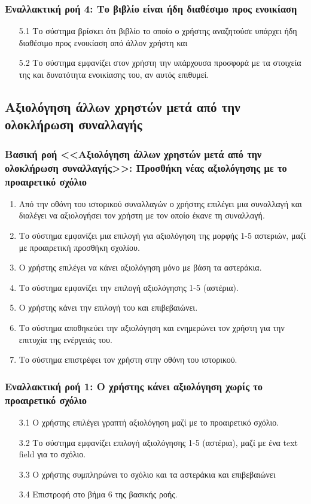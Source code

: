 \documentclass[12pt,a4paper]{article}
\begin{document}
\subsubsection*{Εναλλακτική ροή 4: Το βιβλίο είναι ήδη διαθέσιμο προς ενοικίαση}
\begin{enumerate}
    \item[5.1] Το σύστημα βρίσκει ότι βιβλίο το οποίο ο χρήστης αναζητούσε υπάρχει ήδη διαθέσιμο προς ενοικίαση από άλλον χρήστη και 
    \item[5.2] Το σύστημα εμφανίζει στον χρήστη την υπάρχουσα προσφορά με τα στοιχεία της και δυνατότητα ενοικίασης του, αν αυτός επιθυμεί.
\end{enumerate}

\subsection{Αξιολόγηση άλλων χρηστών μετά από την ολοκλήρωση συναλλαγής}

\subsubsection*{Βασική ροή <<Αξιολόγηση άλλων χρηστών μετά από την ολοκλήρωση συναλλαγής>>: Προσθήκη νέας αξιολόγησης με το προαιρετικό σχόλιο}
\begin{enumerate}
    \item Από την οθόνη του ιστορικού συναλλαγών ο χρήστης επιλέγει μια συναλλαγή και διαλέγει να αξιολογήσει τον χρήστη με τον οποίο έκανε τη συναλλαγή. 
    \item Το σύστημα εμφανίζει μια επιλογή για αξιολόγηση της μορφής 1-5 αστεριών, μαζί με προαιρετική προσθήκη σχολίου. 
    \item Ο χρήστης επιλέγει να κάνει αξιολόγηση μόνο με βάση τα αστεράκια. 
    \item Το σύστημα εμφανίζει την επιλογή αξιολόγησης 1-5 (αστέρια). 
    \item Ο χρήστης κάνει την επιλογή του και επιβεβαιώνει.
    \item Το σύστημα αποθηκεύει την αξιολόγηση και ενημερώνει τον χρήστη για την επιτυχία της ενέργειάς του.
    \item Το σύστημα επιστρέφει τον χρήστη στην οθόνη του ιστορικού.
\end{enumerate}

\subsubsection*{Εναλλακτική ροή 1: Ο χρήστης κάνει αξιολόγηση χωρίς το προαιρετικό σχόλιο}
\begin{enumerate}
    \item[3.1] Ο χρήστης επιλέγει γραπτή αξιολόγηση μαζί με το προαιρετικό σχόλιο. 
    \item[3.2] Το σύστημα εμφανίζει επιλογή αξιολόγησης 1-5 (αστέρια), μαζί με ένα text field για το σχόλιο. 
    \item[3.3] Ο χρήστης συμπληρώνει το σχόλιο και τα αστεράκια και επιβεβαιώνει
    \item[3.4] Επιστροφή στο βήμα 6 της βασικής ροής.
\end{enumerate}
\end{document}
